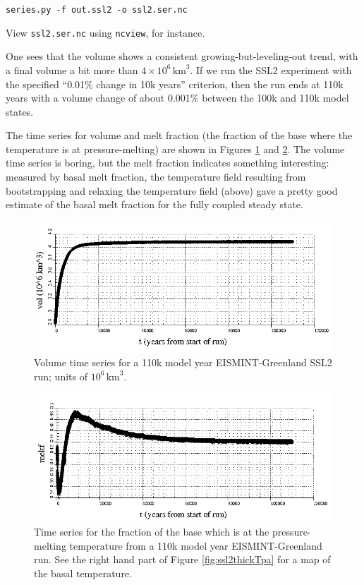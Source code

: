 \documentclass[11pt,final]{amsart}
\begin{document}
\verb|series.py -f out.ssl2 -o ssl2.ser.nc|

\noindent View \verb|ssl2.ser.nc| using \verb|ncview|, for instance.

One sees that the volume shows a consistent growing-but-leveling-out trend, with a final volume a bit more than $4 \times 10^{6}\,\text{km}^3$.  If we run the SSL2 experiment with the specified ``0.01\% change in 10k years'' criterion, then the run ends at 110k years with a volume change of about 0.001\% between the 100k and 110k model states.

The time series for volume and melt fraction (the fraction of the base where the temperature is at pressure-melting) are shown in Figures \ref{fig:eisgrnvolseries} and \ref{fig:eisgrnmeltfseries}.  The volume time series is boring, but the melt fraction indicates something interesting: measured by basal melt fraction, the temperature field resulting from bootstrapping and relaxing the temperature field (above) gave a pretty good estimate of the basal melt fraction for the fully coupled steady state.

\begin{figure}[ht]
\includegraphics[width=6.0in,keepaspectratio=true]{figs/eisgrn_volseries}
\caption{Volume time series for a 110k model year EISMINT-Greenland SSL2 run; units of $10^{6}\,\text{km}^3$.}
\label{fig:eisgrnvolseries}
\end{figure}

\begin{figure}[ht]
\includegraphics[width=6.0in,keepaspectratio=true]{figs/eisgrn_meltfseries}
\caption{Time series for the fraction of the base which is at the pressure-melting temperature from a 110k model year EISMINT-Greenland run.  See the right hand part of Figure \ref{fig:ssl2thickTpa} for a map of the basal temperature.}
\label{fig:eisgrnmeltfseries}
\end{figure}
\end{document}

